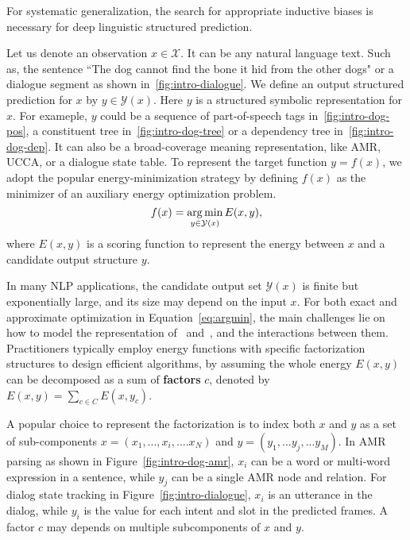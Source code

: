 For systematic generalization, the search for appropriate inductive
biases is necessary for deep linguistic structured prediction.

Let us denote an observation $x \in \mathcal{X}$. It can be any natural
language text. Such as, the sentence ``The dog cannot find the bone it
hid from the other dogs" or a dialogue segment as shown
in~\autoref{fig:intro-dialogue}. We define an output structured
prediction for $x$ by $y \in \mathcal{Y}(x)$. Here $y$ is a structured
symbolic representation for $x$. For exameple, $y$ could be a sequence
of part-of-speech tags in~\autoref{fig:intro-dog-pos}, a constituent
tree in~\autoref{fig:intro-dog-tree} or a dependency tree
in~\autoref{fig:intro-dog-dep}. It can also be a broad-coverage
meaning representation, like AMR, UCCA, or a dialogue state table. To
represent the target function $y=f(x)$, we adopt the popular
energy-minimization strategy by defining $f(x)$ as the minimizer of an
auxiliary energy optimization problem.
\begin{equation}
\label{eq:argmin}
f(x) = \operatorname*{arg\,min}_{y \in \mathcal{Y}(x)} E(x, y),
\end{equation}
where $E(x,y)$ is a scoring function to represent the energy between
$x$ and a candidate output structure $y$.

In many NLP applications, the candidate output set $\mathcal{Y}(x)$ is
finite but exponentially large, and its size may depend on the input
$x$. For both exact and approximate optimization in
Equation~\ref{eq:argmin}, the main challenges lie on how to model the
representation of \IN~and~\OUT, and the interactions between
them. Practitioners typically employ energy functions with specific
factorization structures to design efficient algorithms, by assuming
the whole energy $E(x, y)$ can be decomposed as a sum of
\textbf{factors} $c$, denoted by $E(x, y) =\sum_{c \in C} E(x, y_{c})$.

A popular choice to represent the factorization is to index both $x$
and $y$ as a set of sub-components $x=(x_{1},..., x_{i},.... x_{N})$
and $y=(y_{1},...y_{j},...y_{M})$. In AMR parsing as shown in
Figure~\ref{fig:intro-dog-amr}, $x_{i}$ can be a word or multi-word
expression in a sentence, while $y_{j}$ can be a single AMR node and
relation.  For dialog state tracking in
Figure~\ref{fig:intro-dialogue}, $x_{i}$ is an utterance in the
dialog, while $y_{i}$ is the value for each intent and slot in the
predicted frames. A factor $c$ may depends on multiple subcomponents
of $x$ and $y$.

